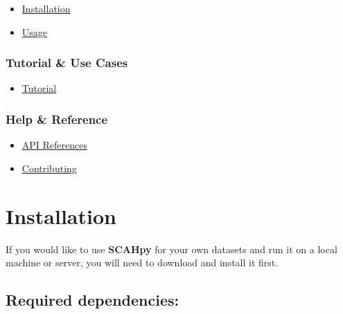 \documentclass[
  letterpaper,
  DIV=11,
  numbers=noendperiod]{scrreprt}
\providecommand{\tightlist}{%
  \setlength{\itemsep}{0pt}\setlength{\parskip}{0pt}}\usepackage{longtable,booktabs,array}
\begin{document}
\begin{itemize}
\tightlist
\item
  \protect\hyperlink{installation}{Installation}
\item
  \protect\hyperlink{usage}{Usage}
\end{itemize}

\hypertarget{tutorial-use-cases}{%
\subsection*{\texorpdfstring{\textbf{Tutorial \& Use
Cases}}{Tutorial \& Use Cases}}\label{tutorial-use-cases}}

\begin{itemize}
\tightlist
\item
  \protect\hyperlink{tutorials}{Tutorial}
\end{itemize}

\hypertarget{help-reference}{%
\subsection*{\texorpdfstring{\textbf{Help \&
Reference}}{Help \& Reference}}\label{help-reference}}

\begin{itemize}
\tightlist
\item
  \protect\hyperlink{api-reference}{API References}
\item
  \protect\hyperlink{contributing}{Contributing}
\end{itemize}

\hypertarget{installation}{%
\chapter*{Installation}\label{installation}}


If you would like to use \textbf{SCAHpy} for your own datasets and run
it on a local machine or server, you will need to download and install
it first.

\hypertarget{required-dependencies}{%
\section*{Required dependencies:}\label{required-dependencies}}
\end{document}
